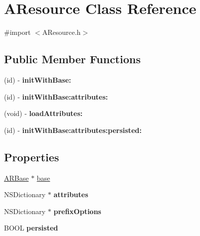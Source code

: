 \hypertarget{interface_a_resource}{
\section{\-A\-Resource \-Class \-Reference}
\label{interface_a_resource}
}


{\ttfamily \#import $<$\-A\-Resource.\-h$>$}

\subsection*{\-Public \-Member \-Functions}
\begin{DoxyCompactItemize}
\item 
\hypertarget{interface_a_resource_ae8558e0345b97c3a12b5796a53302ccb}{
(id) -\/ {\bfseries init\-With\-Base\-:}}
\label{interface_a_resource_ae8558e0345b97c3a12b5796a53302ccb}

\item 
\hypertarget{interface_a_resource_a8c018c41428f849642fbcaf4d8fac20e}{
(id) -\/ {\bfseries init\-With\-Base\-:attributes\-:}}
\label{interface_a_resource_a8c018c41428f849642fbcaf4d8fac20e}

\item 
\hypertarget{interface_a_resource_ab74cb646a5f33f53e44b8837f403a42e}{
(void) -\/ {\bfseries load\-Attributes\-:}}
\label{interface_a_resource_ab74cb646a5f33f53e44b8837f403a42e}

\item 
\hypertarget{interface_a_resource_a07bffbc6341ff76d940622b9db4f37db}{
(id) -\/ {\bfseries init\-With\-Base\-:attributes\-:persisted\-:}}
\label{interface_a_resource_a07bffbc6341ff76d940622b9db4f37db}

\end{DoxyCompactItemize}
\subsection*{\-Properties}
\begin{DoxyCompactItemize}
\item 
\hyperlink{interface_a_r_base}{\-A\-R\-Base} $\ast$ \hyperlink{interface_a_resource_a30040e9c47eb757de009e84ef1afb538}{base}
\item 
\hypertarget{interface_a_resource_a41b90fcbde29cf78475969192bd6aa77}{
\-N\-S\-Dictionary $\ast$ {\bfseries attributes}}
\label{interface_a_resource_a41b90fcbde29cf78475969192bd6aa77}

\item 
\hypertarget{interface_a_resource_a5c2f5f2e7bc77d1a62e6ace01de84a62}{
\-N\-S\-Dictionary $\ast$ {\bfseries prefix\-Options}}
\label{interface_a_resource_a5c2f5f2e7bc77d1a62e6ace01de84a62}

\item 
\hypertarget{interface_a_resource_a10da03073a25a2bfa0cee9bf2b7e0041}{
\-B\-O\-O\-L {\bfseries persisted}}
\label{interface_a_resource_a10da03073a25a2bfa0cee9bf2b7e0041}

\end{DoxyCompactItemize}


